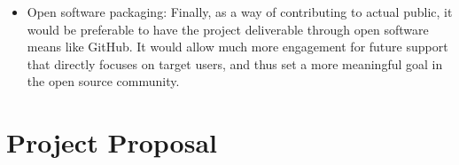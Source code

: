 \documentclass[12pt,a4paper,twoside,openright]{report}
\begin{document}
\begin{itemize}
\item Open software packaging: Finally, as a way of contributing to actual public, it would be preferable to have the project deliverable through open software means like GitHub. It would allow much more engagement for future support that directly focuses on target users, and thus set a more meaningful goal in the open source community.
\end{itemize}


\appendix

\chapter{Project Proposal}
\label{proposallbl}

\end{document}
